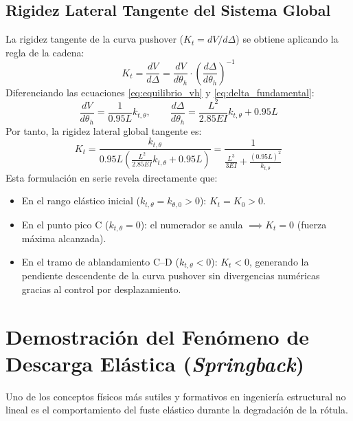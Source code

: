 \documentclass[11pt,letterpaper]{article}
\begin{document}
\subsection{Rigidez Lateral Tangente del Sistema Global}
La rigidez tangente de la curva pushover ($K_t = dV / d\Delta$) se obtiene aplicando la regla de la cadena:
\begin{equation}
K_t = \frac{dV}{d\Delta} = \frac{dV}{d\theta_h} \cdot \left(\frac{d\Delta}{d\theta_h}\right)^{-1}
\end{equation}
Diferenciando las ecuaciones \eqref{eq:equilibrio_vh} y \eqref{eq:delta_fundamental}:
\begin{equation}
\frac{dV}{d\theta_h} = \frac{1}{0.95 L} k_{t,\theta}, \qquad \frac{d\Delta}{d\theta_h} = \frac{L^2}{2.85 E I} k_{t,\theta} + 0.95 L
\end{equation}
Por tanto, la rigidez lateral global tangente es:
\begin{equation}
K_t = \frac{k_{t,\theta}}{0.95 L \left( \frac{L^2}{2.85 E I} k_{t,\theta} + 0.95 L \right)} = \frac{1}{\frac{L^3}{3 E I} + \frac{(0.95 L)^2}{k_{t,\theta}}}
\label{eq:kt_global}
\end{equation}
Esta formulación en serie revela directamente que:
\begin{itemize}
    \item En el rango elástico inicial ($k_{t,\theta} = k_{\theta,0} > 0$): $K_t = K_0 > 0$.
    \item En el punto pico C ($k_{t,\theta} = 0$): el numerador se anula $\implies K_t = 0$ (fuerza máxima alcanzada).
    \item En el tramo de ablandamiento C--D ($k_{t,\theta} < 0$): $K_t < 0$, generando la pendiente descendente de la curva pushover sin divergencias numéricas gracias al control por desplazamiento.
\end{itemize}

\section{Demostración del Fenómeno de Descarga Elástica (\textit{Springback})}

Uno de los conceptos físicos más sutiles y formativos en ingeniería estructural no lineal es el comportamiento del fuste elástico durante la degradación de la rótula.
\end{document}
